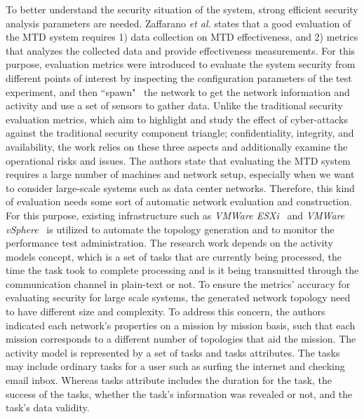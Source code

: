 To better understand the security situation of the system, strong efficient security analysis parameters are needed.  Zaffarano \textit{et al.}  states that a good evaluation of the MTD system requires 1) data collection on MTD effectiveness, and 2) metrics that analyzes the collected data and provide effectiveness measurements. For this purpose, evaluation metrics were introduced to evaluate the system security from different points of interest by inspecting the configuration parameters of the test experiment, and then ``spawn"~ the network to get the network information and activity and use a set of sensors to gather data. Unlike the traditional security evaluation metrics, which aim to highlight and study the effect of cyber-attacks against the traditional security component triangle; confidentiality, integrity, and availability, the work relies on these three aspects and additionally examine the operational risks and issues. The authors state that evaluating the MTD system requires a large number of machines and network setup, especially when we want to consider large-scale systems such as data center networks. Therefore, this kind of evaluation needs some sort of automatic network evaluation and construction. For this purpose, existing infrastructure such as \textit{VMWare ESXi}~ and \textit{VMWare vSphere}~ is utilized to automate the topology generation and to monitor the performance test administration. The research work  depends on the activity models concept, which is a set of tasks that are currently being processed, the time the task took to complete processing and is it being transmitted through the communication channel in plain-text or not. To ensure the metrics' accuracy for evaluating security for large scale systems, the generated network topology need to have different size and complexity. To address this concern, the authors indicated each network's properties on a mission by mission basis, such that each mission corresponds to a different number of topologies that aid the mission. 
The activity model is represented by a set of tasks and tasks attributes. The tasks may include ordinary tasks for a user such as surfing the internet and checking email inbox. Whereas tasks attribute includes the duration for the task, the success of the tasks, whether the task's information was revealed or not, and the task's data validity. 

